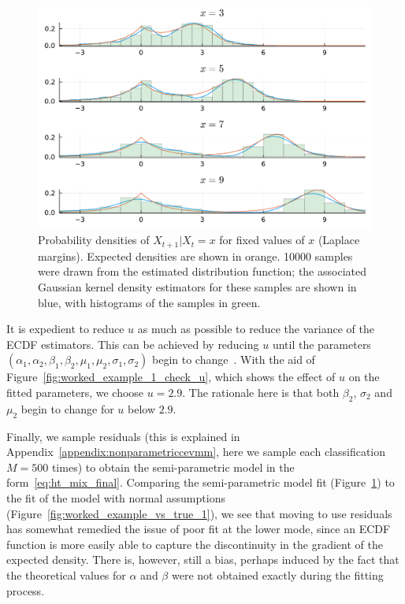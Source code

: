 \documentclass[11pt,twoside,openany]{book}
\numberwithin{Theorem}{chapter}
\numberwithin{Definition}{chapter}
\numberwithin{Lemma}{chapter}
\numberwithin{Algorithm}{chapter}
\numberwithin{equation}{chapter}
\begin{document}
\begin{figure}[htp]
  \centering
  \includegraphics[scale=0.7]{../ht-em/figures/worked_example_vs_true_ecdf.pdf}
  \caption{Probability densities of $X_{t+1}|X_{t}=x$ for fixed values of $x$ (Laplace margins).
    Expected densities are shown in orange. 10000 samples were drawn from the
    estimated distribution function; the associated Gaussian kernel density estimators
    for these samples are shown in blue, with histograms of the samples in green.
   }\label{fig:worked_example_vs_true_1_resids}
\end{figure}
\FloatBarrier
It is expedient to reduce $u$ as much as
possible to reduce the variance of the ECDF estimators. This can be achieved by
reducing $u$ until the parameters
$(\alpha_1,\alpha_2,\beta_1,\beta_2,\mu_1,\mu_2,\sigma_1,\sigma_2)$ begin to
change~\citep{tendijck2021modeling}.
With the aid of Figure~\ref{fig:worked_example_1_check_u}, which
shows the effect of $u$ on the fitted parameters, we choose $u=2.9$.
The rationale here is that both $\beta_2$, $\sigma_2$ and $\mu_2$ begin to change
for $u$ below $2.9$.

Finally, we sample residuals (this is explained in Appendix~\ref{appendix:nonparametriccevmm},
here we sample each classification $M=500$ times)
to obtain the semi-parametric model in the form~\eqref{eq:ht_mix_final}.
Comparing the semi-parametric model fit
(Figure~\ref{fig:worked_example_vs_true_1_resids}) to the fit of the model with
normal assumptions (Figure~\ref{fig:worked_example_vs_true_1}), we see that
moving to use residuals has somewhat remedied the issue of poor fit at the
lower mode, since an ECDF function is more easily able to capture the
discontinuity in the gradient of the expected density. There is, however, still a
bias, perhaps induced by the fact that the theoretical values for $\alpha$ and
$\beta$ were not obtained exactly during the fitting process.
\end{document}
